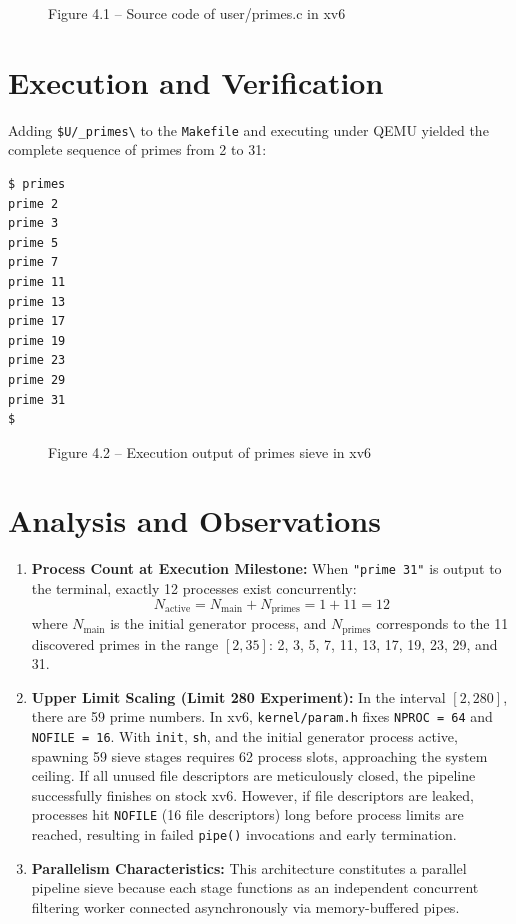 \documentclass[12pt,a4paper]{report}
\numberwithin{equation}{chapter}
\numberwithin{figure}{chapter}
\numberwithin{table}{chapter}
\begin{document}
\begin{figure}[H]
\centering
\caption{Figure 4.1 -- Source code of user/primes.c in xv6}
\end{figure}

\section{Execution and Verification}
Adding \texttt{\$U/\_primes\textbackslash} to the \texttt{Makefile} and executing under QEMU yielded the complete sequence of primes from 2 to 31:

\begin{lstlisting}[language=bash]
$ primes
prime 2
prime 3
prime 5
prime 7
prime 11
prime 13
prime 17
prime 19
prime 23
prime 29
prime 31
$ 
\end{lstlisting}

\begin{figure}[H]
\centering
\caption{Figure 4.2 -- Execution output of primes sieve in xv6}
\end{figure}

\section{Analysis and Observations}
\begin{enumerate}
    \item \textbf{Process Count at Execution Milestone:}
    When \texttt{"prime 31"} is output to the terminal, exactly 12 processes exist concurrently:
    \begin{equation}
        N_{\text{active}} = N_{\text{main}} + N_{\text{primes}} = 1 + 11 = 12
    \end{equation}
    where $N_{\text{main}}$ is the initial generator process, and $N_{\text{primes}}$ corresponds to the 11 discovered primes in the range $[2, 35]$: 2, 3, 5, 7, 11, 13, 17, 19, 23, 29, and 31.
    \item \textbf{Upper Limit Scaling (Limit 280 Experiment):}
    In the interval $[2, 280]$, there are 59 prime numbers. In xv6, \texttt{kernel/param.h} fixes \texttt{NPROC = 64} and \texttt{NOFILE = 16}. With \texttt{init}, \texttt{sh}, and the initial generator process active, spawning 59 sieve stages requires 62 process slots, approaching the system ceiling. If all unused file descriptors are meticulously closed, the pipeline successfully finishes on stock xv6. However, if file descriptors are leaked, processes hit \texttt{NOFILE} (16 file descriptors) long before process limits are reached, resulting in failed \texttt{pipe()} invocations and early termination.
    \item \textbf{Parallelism Characteristics:}
    This architecture constitutes a parallel pipeline sieve because each stage functions as an independent concurrent filtering worker connected asynchronously via memory-buffered pipes.
\end{enumerate}
\end{document}
